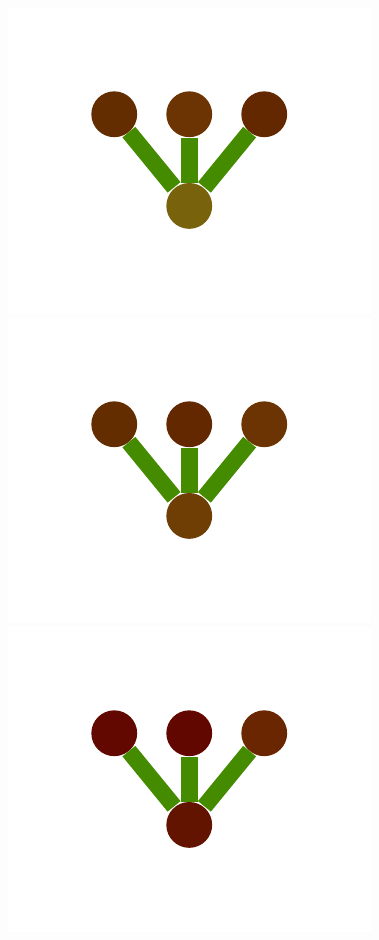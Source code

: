 \documentclass[a4paper,10pt]{article}
\begin{document}
\begin{figure}
{    \includegraphics[scale=.2]{./figures/6-1-single-color-flower-induced-0.pdf}
    \includegraphics[scale=.2]{./figures/6-1-single-color-flower-induced-1.pdf}
    \includegraphics[scale=.2]{./figures/6-1-single-color-flower-induced-2.pdf}
}
\end{figure}
\end{document}
